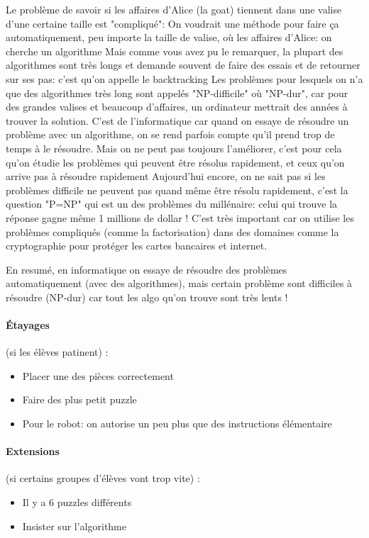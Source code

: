 \documentclass[12pt, a4paper]{article}
\begin{document}
Le problème de savoir si les affaires d'Alice (la goat) tiennent dans une valise d'une certaine taille est "compliqué":
On voudrait une méthode pour faire ça automatiquement, peu importe la taille de valise, où les affaires d'Alice: on cherche un algorithme
Mais comme vous avez pu le remarquer, la plupart des algorithmes sont très longs et demande souvent de faire des essais et de retourner sur ses pas: c'est qu'on appelle le backtracking
Les problèmes pour lesquels on n'a que des algorithmes très long sont appelés "NP-difficile" où "NP-dur", car pour des grandes valises et beaucoup d'affaires, 
un ordinateur mettrait des années à trouver la solution.
C'est de l'informatique car quand on essaye de résoudre un problème avec un algorithme, on se rend parfois compte qu'il prend trop de temps à le résoudre. Mais on ne peut pas toujours l'améliorer,
c'est pour cela qu'on étudie les problèmes qui peuvent être résolus rapidement, et ceux qu'on arrive pas à résoudre rapidement
Aujourd'hui encore, on ne sait pas si les problèmes difficile ne peuvent pas quand même être résolu rapidement, c'est la question "P=NP" qui est un des problèmes du millénaire: celui qui trouve la réponse
gagne même 1 millions de dollar !
C'est très important car on utilise les problèmes compliqués (comme la factorisation) dans des domaines comme la cryptographie pour protéger les cartes bancaires et internet.

En resumé, en informatique on essaye de résoudre des problèmes automatiquement (avec des algorithmes), mais certain problème sont difficiles à résoudre (NP-dur) car tout les algo qu'on trouve sont très lents !


	
	\paragraph*{Étayages} (si les élèves patinent) :
	\begin{itemize}
		\item Placer une des pièces correctement
		\item Faire des plus petit puzzle
		\item Pour le robot: on autorise un peu plus que des instructions élémentaire
	\end{itemize}
	
	\paragraph*{Extensions} (si certains groupes d'élèves vont trop vite) :
	\begin{itemize}
        \item Il y a 6 puzzles différents
		\item Insister sur l'algorithme
	\end{itemize}
\end{document}
